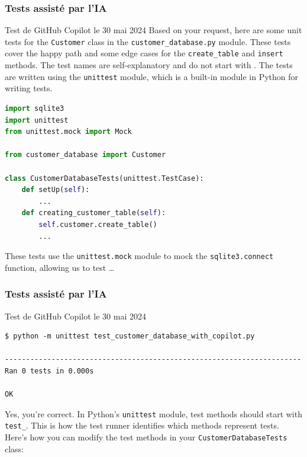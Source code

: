 \documentclass{beamer}
\begin{document}
    \begin{frame}[fragile]
        \transdissolve
        \frametitle{Tests assisté par l'IA}{Test de GitHub Copilot le 30 mai 2024}
        Based on your request, here are some unit tests for the \lstinline{Customer} class in the \lstinline{customer_database.py} module.
        These tests cover the happy path and some edge cases for the \lstinline{create_table} and \lstinline{insert} methods.
        The test names are self-explanatory and do not start with .
        The tests are written using the \lstinline{unittest} module, which is a built-in module in Python for writing tests.
        \begin{lstlisting}[language=Python]
import sqlite3
import unittest
from unittest.mock import Mock

from customer_database import Customer

class CustomerDatabaseTests(unittest.TestCase):
    def setUp(self):
        ...
    def creating_customer_table(self):
        self.customer.create_table()
        ...
        \end{lstlisting}
        These tests use the \lstinline{unittest.mock} module to mock the \lstinline{sqlite3.connect} function, allowing us to test \ldots
    \end{frame}

    \begin{frame}[fragile]
        \transdissolve
        \frametitle{Tests assisté par l'IA}{Test de GitHub Copilot le 30 mai 2024}
        \begin{lstlisting}
$ python -m unittest test_customer_database_with_copilot.py

----------------------------------------------------------------------
Ran 0 tests in 0.000s

OK
        \end{lstlisting}
        \bigbreak
        Yes, you're correct.
        In Python's \lstinline{unittest} module, test methods should start with \lstinline{test_}.
        This is how the test runner identifies which methods represent tests.
        Here's how you can modify the test methods in your \lstinline{CustomerDatabaseTests} class:
    \end{frame}
\end{document}
